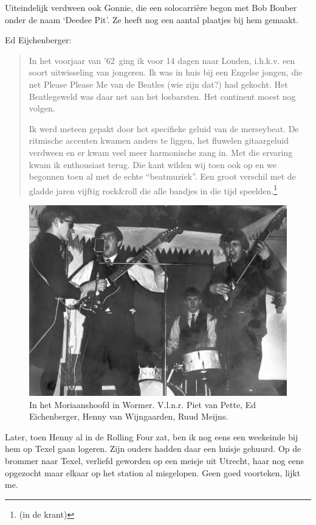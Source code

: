 \documentclass[12pt,twoside, openright]{memoir}
\begin{document}
Uiteindelijk verdween ook Gonnie, die een solocarrière begon met Bob Bouber onder de naam `Deedee Pit'. Ze heeft nog een aantal plaatjes bij hem gemaakt.

Ed Eijchenberger: 

\begin{quote}
In het voorjaar van '62 ging ik voor 14 dagen naar Londen, i.h.k.v. een soort uitwisseling van jongeren. Ik was in huis bij een Engelse jongen, die net Please Please Me van de Beatles (wie zijn dat?) had gekocht. Het Beatlegeweld was daar net aan het losbarsten. Het continent moest nog volgen. 

Ik werd meteen gepakt door het specifieke geluid van de merseybeat. De ritmische accenten kwamen anders te liggen, het fluwelen gitaargeluid verdween en er kwam veel meer harmonische zang in. Met die ervaring kwam ik enthousiast terug. Die kant wilden wij toen ook op en we begonnen toen al met de echte “beatmuziek”. Een groot verschil met de gladde jaren vijftig rock&roll die alle bandjes in die tijd speelden.\footnote{(in de krant)}
\end{quote}

\begin{figure}
\includegraphics[width=\textwidth]{img/ch26/rf-4-moriaan}
\caption*{\footnotesize In het Moriaanshoofd in Wormer. V.l.n.r. Piet van Pette, Ed Eichenberger, Henny van Wijngaarden, Ruud Meijns.}
\end{figure}

Later, toen Henny al in de Rolling Four zat, ben ik nog eens een weekeinde bij hem op Texel gaan logeren. Zijn ouders hadden daar een huisje gehuurd. Op de brommer naar Texel, verliefd geworden op een meisje uit Utrecht, haar nog eens opgezocht maar elkaar op het station al misgelopen. Geen goed voorteken, lijkt me.
\end{document}
